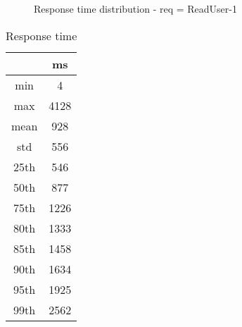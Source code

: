 \begin{minipage}{0.75\linewidth}
\begin{figure}[h]
\begin{adjustbox}{max width=1.0\linewidth, keepaspectratio}
  \end{adjustbox}
  \caption{Response time distribution - req = ReadUser-1}
\end{figure}
\end{minipage}\hfill\begin{minipage}{0.18\linewidth}
\begin{table}[h]
\begin{tabular}{|cc|}
\hline
\textbf{} & \textbf{ms}\\ \hline
 \Xhline{0.005\arrayrulewidth}
min & 4\\
 \Xhline{0.005\arrayrulewidth}
max & 4128\\
 \Xhline{0.005\arrayrulewidth}
mean & 928\\
 \Xhline{0.005\arrayrulewidth}
std & 556\\
\hline
\hline
 \Xhline{0.005\arrayrulewidth}
25th & 546\\
 \Xhline{0.005\arrayrulewidth}
50th & 877\\
 \Xhline{0.005\arrayrulewidth}
75th & 1226\\
 \Xhline{0.005\arrayrulewidth}
80th & 1333\\
 \Xhline{0.005\arrayrulewidth}
85th & 1458\\
 \Xhline{0.005\arrayrulewidth}
90th & 1634\\
 \Xhline{0.005\arrayrulewidth}
95th & 1925\\
 \Xhline{0.005\arrayrulewidth}
99th & 2562\\
\hline
\end{tabular}
\caption{Response time}
\end{table}
\end{minipage}\hfill